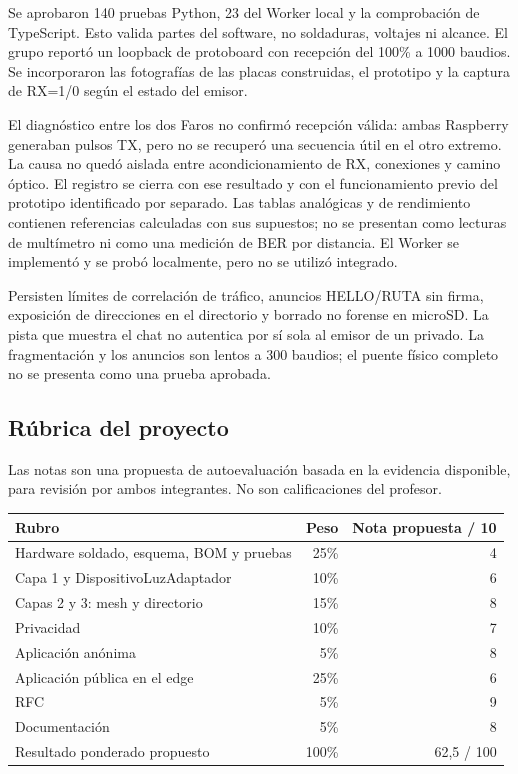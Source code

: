 \documentclass[11pt,letterpaper]{article}
\begin{document}
Se aprobaron 140 pruebas Python, 23 del Worker local y la comprobación de
TypeScript. Esto valida partes del software, no soldaduras, voltajes ni alcance.
El grupo reportó un loopback de protoboard con recepción del 100\% a 1000 baudios.
Se incorporaron las fotografías de las placas construidas, el prototipo y la
captura de RX=1/0 según el estado del emisor.

El diagnóstico entre los dos Faros no confirmó recepción válida: ambas Raspberry
generaban pulsos TX, pero no se recuperó una secuencia útil en el otro extremo.
La causa no quedó aislada entre acondicionamiento de RX, conexiones y camino
óptico. El registro se cierra con ese resultado y con el funcionamiento previo
del prototipo identificado por separado. Las tablas analógicas y de rendimiento
contienen referencias calculadas con sus supuestos; no se presentan como lecturas
de multímetro ni como una medición de BER por distancia. El Worker se implementó
y se probó localmente, pero no se utilizó integrado.

Persisten límites de correlación de tráfico, anuncios HELLO/RUTA sin firma,
exposición de direcciones en el directorio y borrado no forense en microSD.
La pista que muestra el chat no autentica por sí sola al emisor de un privado.
La fragmentación y los anuncios son lentos a 300 baudios; el puente físico
completo no se presenta como una prueba aprobada.

\subsection{Rúbrica del proyecto}

Las notas son una propuesta de autoevaluación basada en la evidencia disponible,
para revisión por ambos integrantes. No son calificaciones del profesor.

{\small
\begin{tabularx}{\linewidth}{X r r}
\toprule
Rubro & Peso & Nota propuesta / 10\\
\midrule
Hardware soldado, esquema, BOM y pruebas & 25\% & 4\\
Capa 1 y DispositivoLuzAdaptador & 10\% & 6\\
Capas 2 y 3: mesh y directorio & 15\% & 8\\
Privacidad & 10\% & 7\\
Aplicación anónima & 5\% & 8\\
Aplicación pública en el edge & 25\% & 6\\
RFC & 5\% & 9\\
Documentación & 5\% & 8\\
\midrule
Resultado ponderado propuesto & 100\% & 62,5 / 100\\
\bottomrule
\end{tabularx}}
\end{document}
